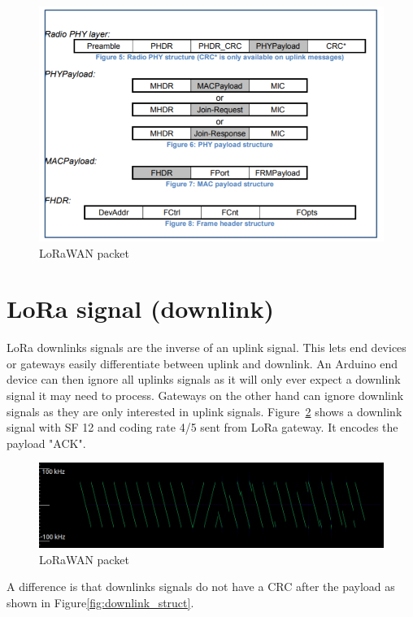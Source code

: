 \begin{figure}[h]
    \centering
    \includegraphics[width=1\textwidth]{figures/lorawan_struct.png}
    \caption{LoRaWAN packet~\cite{lora_wan_spec}}
    \label{fig:lora_wan_struct}
\end{figure}

\section{LoRa signal (downlink)}
LoRa downlinks signals are the inverse of an uplink signal. 
This lets end devices or gateways easily differentiate between uplink and downlink.
An Arduino end device can then ignore all uplinks signals as it will only ever expect a downlink signal it may need to process.
Gateways on the other hand can ignore downlink signals as they are only interested in uplink signals.
Figure~\ref{fig:lora_down_sig} shows a downlink signal with SF 12 and coding rate 4/5 sent from LoRa gateway. It encodes the payload "ACK".
\begin{figure}[h]
    \centering
    \includegraphics[width=1\textwidth]{figures/down_ack_sf_12_cr_4_5.png}
    \caption{LoRaWAN packet~\cite{lora_wan_spec}}
    \label{fig:lora_down_sig}
\end{figure}
A difference is that downlinks signals 
do not have a CRC after the payload as shown in Figure\ref{fig:downlink_struct}.

